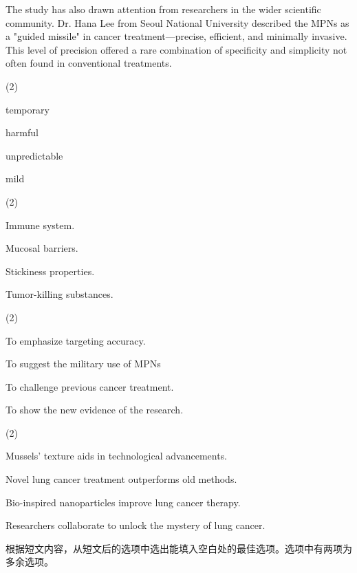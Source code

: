 \documentclass{英语试卷}
\begin{document}
\par The study has also drawn attention from researchers in the wider scientific community. Dr. Hana Lee from Seoul National University described the MPNs as a "guided missile" in cancer treatment—precise, efficient, and minimally invasive. This level of precision offered a rare combination of specificity and simplicity not often found in conventional treatments.\par
{}
\begin{choices}(2)
  \item temporary
  \item harmful
  \item unpredictable
  \item mild
\end{choices}
\begin{choices}(2)
  \item Immune system.
  \item Mucosal barriers.
  \item Stickiness properties.
  \item Tumor-killing substances.
\end{choices}
\begin{choices}(2)
  \item To emphasize targeting accuracy.
  \item To suggest the military use of MPNs
  \item To challenge previous cancer treatment.
  \item To show the new evidence of the research.
\end{choices}
\begin{choices}(2)
  \item Mussels' texture aids in technological advancements.
  \item Novel lung cancer treatment outperforms old methods.
  \item Bio-inspired nanoparticles improve lung cancer therapy.
  \item Researchers collaborate to unlock the mystery of lung cancer.
\end{choices}
\par 根据短文内容，从短文后的选项中选出能填入空白处的最佳选项。选项中有两项为多余选项。\par
\end{document}
